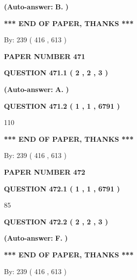 \documentclass{ctexart}
\begin{document}
 
{\textbf{(Auto-answer:}}
{\textbf{\large{
B.}}}
{\textbf{)}}
 
 
   
   
   
   
\vspace{1.0in} 
{\textbf{\large{ *** END OF PAPER, THANKS *** }}} 
   
   
\hspace{1.0in} By: 
 239 ( 416 ,  613 )
   
   
   
   
\newpage 
\setcounter{page}{ 
   471001 } 
   
   
 {\textbf{ \Large{ PAPER NUMBER  471  }}}
   
   
   
   
  
  
{\textbf{\large{QUESTION
471.1 
 ( 2 , 2 , 3 )
}}}
 
 
{\textbf{(Auto-answer:}}
{\textbf{\large{
A.}}}
{\textbf{)}}
 
 
  
  
{\textbf{\large{QUESTION
471.2 
 ( 1 , 1 , 6791 )
}}}

110
   
   
   
   
\vspace{1.0in} 
{\textbf{\large{ *** END OF PAPER, THANKS *** }}} 
   
   
\hspace{1.0in} By: 
 239 ( 416 ,  613 )
   
   
   
   
\newpage 
\setcounter{page}{ 
   472001 } 
   
   
 {\textbf{ \Large{ PAPER NUMBER  472  }}}
   
   
   
   
  
  
{\textbf{\large{QUESTION
472.1 
 ( 1 , 1 , 6791 )
}}}

85
  
  
{\textbf{\large{QUESTION
472.2 
 ( 2 , 2 , 3 )
}}}
 
 
{\textbf{(Auto-answer:}}
{\textbf{\large{
F.}}}
{\textbf{)}}
 
 
   
   
   
   
\vspace{1.0in} 
{\textbf{\large{ *** END OF PAPER, THANKS *** }}} 
   
   
\hspace{1.0in} By: 
 239 ( 416 ,  613 )
   
   
   
\end{document}
